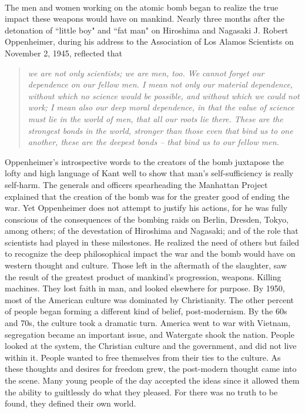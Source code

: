\documentclass[10pt]{article}
\begin{document}
\paragraph{}
The men and women working on the atomic bomb began to realize the true impact these weapons would have on mankind. Nearly three months after the detonation of ``little boy" and ``fat man" on Hiroshima and Nagasaki J. Robert Oppenheimer, during his address to the Association of Los Alamos Scientists on November 2, 1945, reflected that
{\small \begin{quote}
	\centering
	\textit{we are not only scientists; we are men, too. We cannot forget our dependence on our fellow men. I mean not only our material dependence, without which no science would be possible, and without which we could not work; I mean also our deep moral dependence, in that the value of science must lie in the world of men, that all our roots lie there. These are the strongest bonds in the world, stronger than those even that bind us to one another, these are the deepest bonds -- that bind us to our fellow men.}\textsuperscript{\cite{Oppenheimer1945}}
\end{quote}}
Oppenheimer's introspective words to the creators of the bomb juxtapose the lofty and high language of Kant well to show that man's self-sufficiency is really self-harm. The generals and officers spearheading the Manhattan Project explained that the creation of the bomb was for the greater good of ending the war. Yet Oppenheimer does not attempt to justify his actions, for he was fully conscious of the consequences of the bombing raids on Berlin, Dresden, Tokyo, among others; of the devestation of Hiroshima and Nagasaki; and of the role that scientists had played in these milestones.\textsuperscript{\cite{Schweber2007}} He realized the need of others but failed to recognize the deep philosophical impact the war and the bomb would have on western thought and culture. Those left in the aftermath of the slaughter, saw the result of the greatest product of mankind’s progression, weapons. Killing machines. They lost faith in man, and looked elsewhere for purpose. By 1950, most of the American culture was dominated by Christianity. The other percent of people began forming a different kind of belief, post-modernism. By the 60s and 70s, the culture took a dramatic turn. America went to war with Vietnam, segregation became an important issue, and Watergate shook the nation. People looked at the system, the Christian culture and the government, and did not live within it. People wanted to free themselves from their ties to the culture. As these thoughts and desires for freedom grew, the post-modern thought came into the scene. Many young people of the day accepted the ideas since it allowed them the ability to guiltlessly do what they pleased. For there was no truth to be found, they defined their own world.
\end{document}
